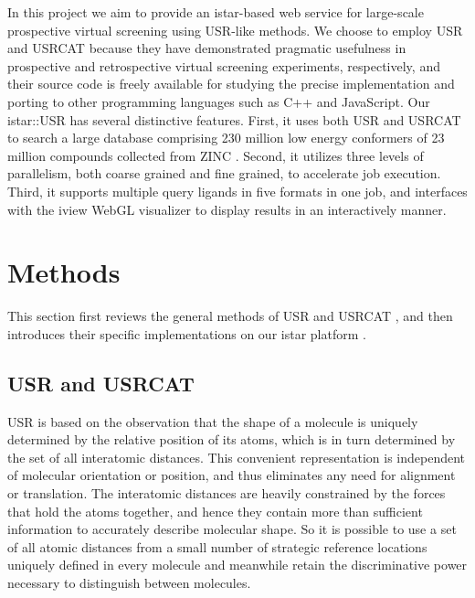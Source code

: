 In this project we aim to provide an istar-based \citep{1362} web service for large-scale prospective virtual screening using USR-like methods. We choose to employ USR \citep{1379} and USRCAT \citep{1331} because they have demonstrated pragmatic usefulness in prospective \citep{1380} and retrospective \citep{1331} virtual screening experiments, respectively, and their source code is freely available for studying the precise implementation and porting to other programming languages such as C++ and JavaScript. Our istar::USR has several distinctive features. First, it uses both USR and USRCAT to search a large database comprising 230 million low energy conformers of 23 million compounds collected from ZINC \citep{532,1178}. Second, it utilizes three levels of parallelism, both coarse grained and fine grained, to accelerate job execution. Third, it supports multiple query ligands in five formats in one job, and interfaces with the iview \citep{1366} WebGL visualizer to display results in an interactively manner.

\section{Methods}

This section first reviews the general methods of USR \citep{1379} and USRCAT \citep{1331}, and then introduces their specific implementations on our istar platform \citep{1362}.

\subsection{USR and USRCAT}

USR is based on the observation that the shape of a molecule is uniquely determined by the relative position of its atoms, which is in turn determined by the set of all interatomic distances. This convenient representation is independent of molecular orientation or position, and thus eliminates any need for alignment or translation. The interatomic distances are heavily constrained by the forces that hold the atoms together, and hence they contain more than sufficient information to accurately describe molecular shape. So it is possible to use a set of all atomic distances from a small number of strategic reference locations uniquely defined in every molecule and meanwhile retain the discriminative power necessary to distinguish between molecules.

